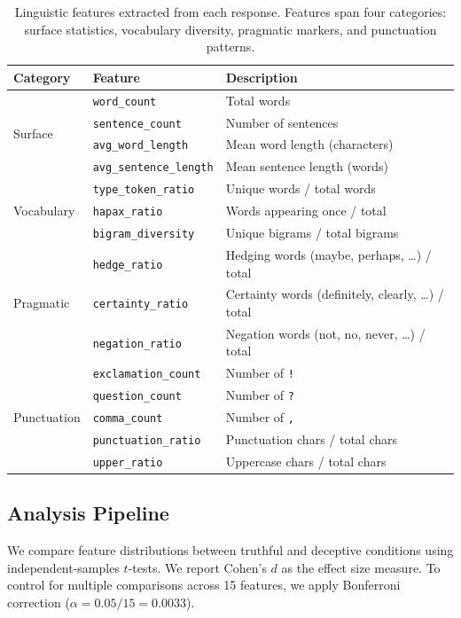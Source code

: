 \begin{table}[t]
\centering
\caption{Linguistic features extracted from each response. Features span four categories: surface statistics, vocabulary diversity, pragmatic markers, and punctuation patterns.}
\label{tab:features}
\small
\begin{tabular}{@{}lll@{}}
\toprule
\textbf{Category} & \textbf{Feature} & \textbf{Description} \\
\midrule
\multirow{4}{*}{Surface} & \texttt{word\_count} & Total words \\
& \texttt{sentence\_count} & Number of sentences \\
& \texttt{avg\_word\_length} & Mean word length (characters) \\
& \texttt{avg\_sentence\_length} & Mean sentence length (words) \\
\midrule
\multirow{3}{*}{Vocabulary} & \texttt{type\_token\_ratio} & Unique words / total words \\
& \texttt{hapax\_ratio} & Words appearing once / total \\
& \texttt{bigram\_diversity} & Unique bigrams / total bigrams \\
\midrule
\multirow{3}{*}{Pragmatic} & \texttt{hedge\_ratio} & Hedging words (maybe, perhaps, \ldots) / total \\
& \texttt{certainty\_ratio} & Certainty words (definitely, clearly, \ldots) / total \\
& \texttt{negation\_ratio} & Negation words (not, no, never, \ldots) / total \\
\midrule
\multirow{5}{*}{Punctuation} & \texttt{exclamation\_count} & Number of \texttt{!} \\
& \texttt{question\_count} & Number of \texttt{?} \\
& \texttt{comma\_count} & Number of \texttt{,} \\
& \texttt{punctuation\_ratio} & Punctuation chars / total chars \\
& \texttt{upper\_ratio} & Uppercase chars / total chars \\
\bottomrule
\end{tabular}
\end{table}

\subsection{Analysis Pipeline}
\label{sec:analysis}

We compare feature distributions between truthful and deceptive conditions using independent-samples $t$-tests. We report Cohen's $d$ as the effect size measure. To control for multiple comparisons across 15 features, we apply Bonferroni correction ($\alpha = 0.05 / 15 = 0.0033$).

